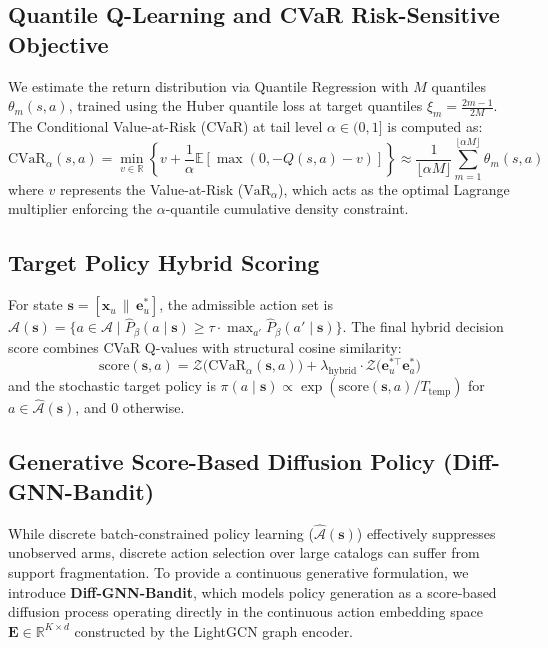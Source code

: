 \documentclass[preprint,12pt,3p]{elsarticle}
\begin{document}
\subsection{Quantile Q-Learning and CVaR Risk-Sensitive Objective}
We estimate the return distribution via Quantile Regression with $M$ quantiles $\theta_m(s, a)$, trained using the Huber quantile loss at target quantiles $\xi_m = \frac{2m - 1}{2M}$. The Conditional Value-at-Risk (CVaR) at tail level $\alpha \in (0, 1]$ is computed as:
\begin{equation}
\text{CVaR}_\alpha(s, a) = \min_{v \in \mathbb{R}} \left\{ v + \frac{1}{\alpha} \mathbb{E}\left[ \max(0, -Q(s, a) - v) \right] \right\} \approx \frac{1}{\lfloor \alpha M \rfloor} \sum_{m=1}^{\lfloor \alpha M \rfloor} \theta_m(s, a)
\end{equation}
where $v$ represents the Value-at-Risk ($\text{VaR}_\alpha$), which acts as the optimal Lagrange multiplier enforcing the $\alpha$-quantile cumulative density constraint.

\subsection{Target Policy Hybrid Scoring}
For state $\mathbf{s} = [\mathbf{x}_u \,\|\, \mathbf{e}_u^*]$, the admissible action set is $\hat{\mathcal{A}}(\mathbf{s}) = \{ a \in \mathcal{A} \mid \hat{P}_\beta(a \mid \mathbf{s}) \ge \tau \cdot \max_{a'} \hat{P}_\beta(a' \mid \mathbf{s}) \}$. The final hybrid decision score combines CVaR Q-values with structural cosine similarity:
\begin{equation}
\text{score}(\mathbf{s}, a) = \mathcal{Z}\Big( \text{CVaR}_\alpha(\mathbf{s}, a) \Big) + \lambda_{\mathrm{hybrid}} \cdot \mathcal{Z}\Big( \mathbf{e}_u^{*\top} \mathbf{e}_a^* \Big)
\end{equation}
and the stochastic target policy is $\pi(a \mid \mathbf{s}) \propto \exp(\text{score}(\mathbf{s}, a)/T_{\mathrm{temp}})$ for $a \in \hat{\mathcal{A}}(\mathbf{s})$, and $0$ otherwise.

\subsection{Generative Score-Based Diffusion Policy (Diff-GNN-Bandit)}
\label{sec:diffusion_policy}
While discrete batch-constrained policy learning ($\hat{\mathcal{A}}(\mathbf{s})$) effectively suppresses unobserved arms, discrete action selection over large catalogs can suffer from support fragmentation. To provide a continuous generative formulation, we introduce \textbf{Diff-GNN-Bandit}, which models policy generation as a score-based diffusion process operating directly in the continuous action embedding space $\mathbf{E} \in \mathbb{R}^{K \times d}$ constructed by the LightGCN graph encoder.
\end{document}
